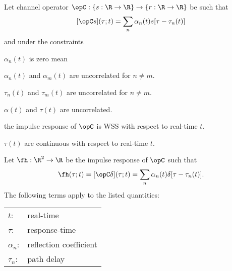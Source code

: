 \begin{definition}
\label{def:mpath}
Let channel operator $\opC:\{s:\R\to\R\}\to\{r:\R\to\R\}$ 
be such that 
  \[ [\opC s](\tau;t) = \sum_n \alpha_n(t) s[\tau-\tau_n(t)] \]
and under the constraints
\begin{enume}
   \item $\alpha_n(t)$ is zero mean
   \item $\alpha_n(t)$ and $\alpha_m(t)$ are uncorrelated for $n\not=m$.
   \item $\tau_n(t)$ and $\tau_m(t)$ are uncorrelated for $n\not=m$.
   \item $\alpha(t)$ and $\tau(t)$ are uncorrelated.
   \item the impulse response of $\opC$  is WSS with respect to real-time $t$.
   \item $\tau(t)$ are continuous with respect to real-time $t$.
\end{enume}
Let $\fh:\R^2\to\R$ be the impulse response of $\opC$ such that 
  \[ \fh(\tau;t) = [\opC\delta](\tau;t)
                 = \sum_n \alpha_n(t) \delta[\tau-\tau_n(t)]. \]
The following terms apply to the listed quantities:

\begin{tabular}[b]{ll}
   $t$:        & real-time               \\
   $\tau$:     & response-time           \\
   $\alpha_n$: & reflection coefficient  \\
   $\tau_n$:   & path delay 
\end{tabular}
\end{definition}

